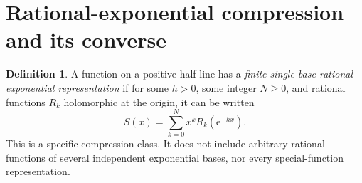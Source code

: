 \documentclass[11pt,a4paper]{article}
\numberwithin{equation}{section}
\theoremstyle{definition}
\newtheorem{definition}[theorem]{Definition}
\theoremstyle{remark}
\newcommand{\e}{\mathrm e}
\begin{document}
\section{Rational-exponential compression and its converse}
\label{sec:rational}

\begin{definition}
A function on a positive half-line has a \emph{finite single-base
rational-exponential representation} if for some $h>0$, some integer
$N\ge0$, and rational functions $R_k$ holomorphic at the origin, it can
be written
\begin{equation}
 S(x)=\sum_{k=0}^{N}x^k R_k(\e^{-hx}).
 \label{eq:rationalform}
\end{equation}
This is a specific compression class. It does not include arbitrary
rational functions of several independent exponential bases, nor every
special-function representation.
\end{definition}
\end{document}
